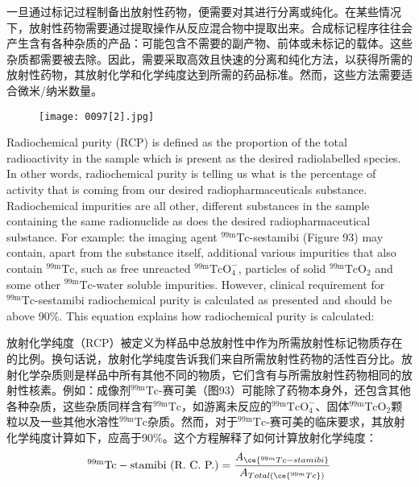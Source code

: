 \documentclass[dvipsnames, svgnames,a4paper,11pt]{article}
\begin{document}
一旦通过标记过程制备出放射性药物，便需要对其进行分离或纯化。在某些情况下，放射性药物需要通过提取操作从反应混合物中提取出来。合成标记程序往往会产生含有各种杂质的产品：可能包含不需要的副产物、前体或未标记的载体。这些杂质都需要被去除。因此，需要采取高效且快速的分离和纯化方法，以获得所需的放射性药物，其放射化学和化学纯度达到所需的药品标准。然而，这些方法需要适合微米/纳米数量。

\begin{wrapfigure}{r}{0.3\textwidth}
      \centering
      \texttt{[image: 0097[2].jpg]}
       \label{fig93}
  \end{wrapfigure}

Radiochemical purity (RCP) is defined as the
proportion of the total radioactivity in the sample
which is present as the desired radiolabelled
species. In other words, radiochemical purity is
telling us what is the percentage of activity that is
coming from our desired radiopharmaceuticals
substance. Radiochemical impurities are all other,
different substances in the sample containing the
same radionuclide as does the desired
radiopharmaceutical substance. For example:
the imaging agent ${}^\mathrm{99m}\mathrm{Tc}$-sestamibi (Figure 93) may contain, apart from the
substance itself, additional various impurities that also contain ${}^\mathrm{99m}\mathrm{Tc}$, such as free
unreacted ${}^\mathrm{99m}\mathrm{TcO_4^-}$, particles of solid ${}^\mathrm{99m}\mathrm{TcO_2}$ and some other ${}^\mathrm{99m}\mathrm{Tc}$-water soluble
impurities. However, clinical requirement for ${}^\mathrm{99m}\mathrm{Tc}$-sestamibi radiochemical purity is
calculated as presented and should be above 90\%. This equation explains how
radiochemical purity is calculated:

放射化学纯度（RCP）被定义为样品中总放射性中作为所需放射性标记物质存在的比例。换句话说，放射化学纯度告诉我们来自所需放射性药物的活性百分比。放射化学杂质则是样品中所有其他不同的物质，它们含有与所需放射性药物相同的放射性核素。例如：成像剂${}^\mathrm{99m}\mathrm{Tc}$-赛可美（图93）可能除了药物本身外，还包含其他各种杂质，这些杂质同样含有${}^\mathrm{99m}\mathrm{Tc}$，如游离未反应的${}^\mathrm{99m}\mathrm{TcO_4^-}$、固体${}^\mathrm{99m}\mathrm{TcO_2}$颗粒以及一些其他水溶性${}^\mathrm{99m}\mathrm{Tc}$杂质。然而，对于${}^\mathrm{99m}\mathrm{Tc}$-赛可美的临床要求，其放射化学纯度计算如下，应高于90\%。这个方程解释了如何计算放射化学纯度：
$$\mathrm{^{99m}Tc}- \text{stamibi (R. C. P.)} = \frac{A_{\ce{^{99m}Tc-stamibi}}}{A_{Total(\ce{^{99m}Tc})}} 
$$
\end{document}
